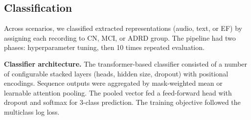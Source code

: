 \documentclass{article}
\begin{document}
{\subsection{Classification}
\label{sssec:subsubhead}






Across scenarios, we classified extracted representations (audio, text, or EF) by assigning each recording to CN, MCI, or ADRD group. The pipeline had two phases: hyperparameter tuning, then 10 times repeated evaluation.



\textbf{Classifier architecture.} The transformer-based classifier consisted of a number of configurable stacked layers (heads, hidden size, dropout) with positional encodings. Sequence outputs were aggregated by mask-weighted mean or learnable attention pooling. The pooled vector fed a feed-forward head with dropout and softmax for 3-class prediction. The training objective followed the multiclass log loss.

}
\end{document}
